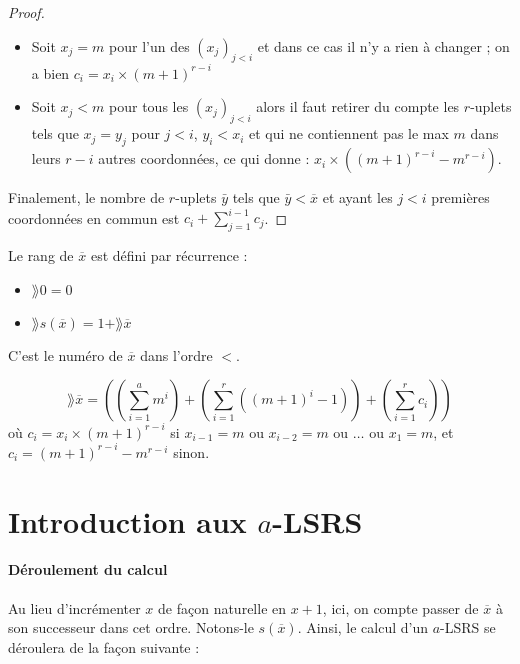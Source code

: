 \begin{proof}
			\begin{itemize}[itemsep=-1mm]
				\item	Soit $x_j = m$ pour l'un des $\left(x_j\right)_{j < i}$ et dans ce cas il n'y a rien à changer ; on a bien $c_i = x_i \times \left(m+1\right)^{r-i}$
				\item 	Soit $x_j < m$ pour tous les $\left(x_j\right)_{j < i}$ alors il faut retirer du compte les $r$-uplets tels que $x_j = y_j$ pour $j < i$, $y_i < x_i$ et qui ne contiennent pas le max $m$ dans leurs $r-i$ autres coordonnées, ce qui donne : $x_i \times \left(\left(m+1\right)^{r-i} - m^{r-i}\right)$.
			\end{itemize}
			
			Finalement, le nombre de $r$-uplets $\bar{y}$ tels que $\bar{y} < \overline{x}$ et ayant les $j<i$ premières coordonnées en commun est $c_i + \sum_{j=1}^{i-1} c_j$.
		\end{proof}
		
		\begin{definition}
			Le rang de $\overline{x}$ est défini par récurrence : 
			
			\begin{itemize}[itemsep=-1mm]
				\item 	$\rang{0} = 0$
				\item 	$\rang{s\left(\overline{x}\right)} = 1 + \rang{\overline{x}}$
			\end{itemize}
		\end{definition}
		
		C'est le numéro de $\overline{x}$ dans l'ordre $<$.
		
		\begin{coro}
			\label{coro:rang_bon_ordre}
			\[
				\rang{\overline{x}} = \left( \left( \sum_{i=1}^{a} m^i \right) + \left( \sum_{i=1}^{r} \left( \left(m+1\right)^i -1 \right) \right) + \left(\sum_{i=1}^{r} c_i \right) \right)
			\]
			où $c_i = x_i \times \left(m+1\right)^{r-i}$ si $x_{i-1} = m$ ou $x_{i-2} = m$ ou $\dots$ ou $x_{1} = m$, et $c_i = \left(m+1\right)^{r-i}-m^{r-i}$ sinon. 
		\end{coro}
		
		
	
	\section{Introduction aux $a$-LSRS}
	\label{par:deroulement_aLSRS}
	
	\paragraph{Déroulement du calcul}
		Au lieu d'incrémenter $x$ de façon naturelle en $x+1$, ici, on compte passer de $\overline{x}$ à son successeur dans cet ordre. Notons-le $s\left(\overline{x}\right)$. Ainsi, le calcul d'un $a$-LSRS se déroulera de la façon suivante :
		
